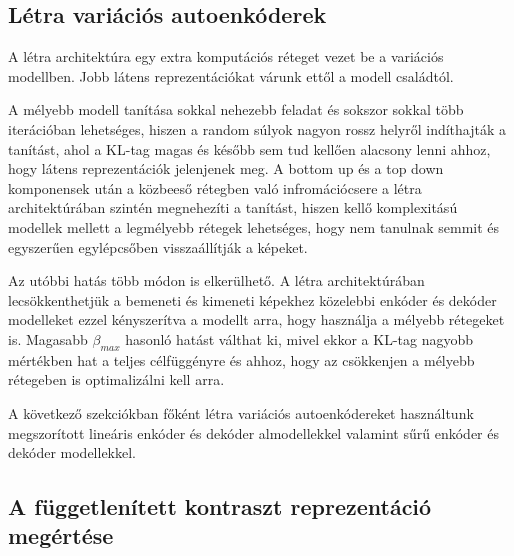 \documentclass[12pt, english]{article}
\begin{document}
\newpage

\subsection{Létra variációs autoenkóderek}

\vspace{5mm}

\par A létra architektúra egy extra komputációs réteget vezet be a variációs modellben. Jobb látens reprezentációkat várunk ettől a modell családtól.

\vspace{4mm}

\par A mélyebb modell tanítása sokkal nehezebb feladat és sokszor sokkal több iterációban lehetséges, hiszen a random súlyok nagyon rossz helyről indíthajták a tanítást, ahol a KL-tag magas és később sem tud kellően alacsony lenni ahhoz, hogy látens reprezentációk jelenjenek meg. A bottom up és a top down komponensek után a közbeeső rétegben való infromációcsere a létra architektúrában szintén megnehezíti a tanítást, hiszen kellő komplexitású modellek mellett a legmélyebb rétegek lehetséges, hogy nem tanulnak semmit és egyszerűen egylépcsőben visszaállítják a képeket.

\vspace{4mm}

\par Az utóbbi hatás több módon is elkerülhető. A létra architektúrában lecsökkenthetjük a bemeneti és kimeneti képekhez közelebbi enkóder és dekóder modelleket ezzel kényszerítva a modellt arra, hogy használja a mélyebb rétegeket is. Magasabb $\beta_{max}$ hasonló hatást válthat ki, mivel ekkor a KL-tag nagyobb mértékben hat a teljes célfüggényre és ahhoz, hogy az csökkenjen a mélyebb rétegeben is optimalizálni kell arra.

\vspace{4mm}

\par A következő szekciókban főként létra variációs autoenkódereket használtunk megszorított lineáris enkóder és dekóder almodellekkel valamint sűrű enkóder és dekóder modellekkel.

\vspace{7mm}

\subsection{A függetlenített kontraszt reprezentáció megértése}
\end{document}
